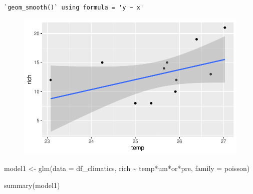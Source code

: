 \documentclass[
  letterpaper,
  DIV=11,
  numbers=noendperiod]{scrartcl}
\newenvironment{Shaded}{\begin{snugshade}}{\end{snugshade}}
\newcommand{\AttributeTok}[1]{\textcolor[rgb]{0.40,0.45,0.13}{#1}}
\newcommand{\FunctionTok}[1]{\textcolor[rgb]{0.28,0.35,0.67}{#1}}
\newcommand{\NormalTok}[1]{\textcolor[rgb]{0.00,0.23,0.31}{#1}}
\newcommand{\OtherTok}[1]{\textcolor[rgb]{0.00,0.23,0.31}{#1}}
\newcommand{\SpecialCharTok}[1]{\textcolor[rgb]{0.37,0.37,0.37}{#1}}
\newcommand{\StringTok}[1]{\textcolor[rgb]{0.13,0.47,0.30}{#1}}
\begin{document}
\begin{verbatim}
`geom_smooth()` using formula = 'y ~ x'
\end{verbatim}

\begin{figure}[H]

{\centering \includegraphics{report_nmds_files/figure-pdf/unnamed-chunk-11-1.pdf}

}

\end{figure}

\begin{Shaded}
\begin{Highlighting}[]
\NormalTok{model1 }\OtherTok{\textless{}{-}} \FunctionTok{glm}\NormalTok{(}\AttributeTok{data =}\NormalTok{ df\_climatics, }
\NormalTok{              rich }\SpecialCharTok{\textasciitilde{}}\NormalTok{ temp}\SpecialCharTok{*}\NormalTok{um}\SpecialCharTok{*}\NormalTok{or}\SpecialCharTok{*}\NormalTok{pre, }\AttributeTok{family =} \StringTok{\textquotesingle{}poisson\textquotesingle{}}\NormalTok{)}

\FunctionTok{summary}\NormalTok{(model1)}
\end{Highlighting}
\end{Shaded}
\end{document}
